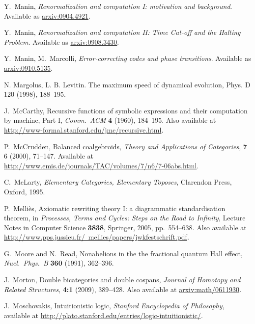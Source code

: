 \documentclass[12pt,twoside,openright]{report}
\begin{document}
\begin{thebibliography}{99}
 Y.\ Manin, \textsl{Renormalization and computation I: motivation and background}.  Available as
\href{http://arxiv.org/abs/0904.4921}{arxiv:0904.4921}.

 Y.\ Manin, \textsl{Renormalization and computation II: Time Cut-off and the Halting Problem}. Available as
\href{http://arxiv.org/abs/0908.3430}{arxiv:0908.3430}.

 Y.\ Manin, M.\ Marcolli, \textsl{Error-correcting codes and phase transitions}. Available as
\href{http://arxiv.org/abs/0910.5135}{arxiv:0910.5135}.

 N. Margolus, L. B. Levitin. The maximum speed of dynamical evolution, Phys. D 120 (1998), 188--195.

 J.\ McCarthy, Recursive functions of symbolic expressions and their computation by machine, Part I, 
{\sl Comm.\ ACM} {\bf 4} (1960), 184--195.  Also available at 
\href{http://www-formal.stanford.edu/jmc/recursive.html}
{http://www-formal.stanford.edu/jmc/recursive.html}.

 P.\ McCrudden, Balanced coalgebroids, \textsl{Theory and Applications of Categories}, \textbf{7} 6 (2000), 71--147.  Available at \href{http://www.emis.de/journals/TAC/volumes/7/n6/7-06abs.html}{http://www.emis.de/journals/TAC/volumes/7/n6/7-06abs.html}.

 C.\ McLarty, {\sl Elementary Categories, Elementary Toposes}, Clarendon Press, Oxford, 1995.

 P.\ Melli\`es, Axiomatic rewriting theory I: a diagrammatic standardisation theorem, in {\sl Processes, Terms and Cycles: Steps on the Road to Infinity}, Lecture Notes in Computer Science {\bf 3838}, Springer, 2005, pp.\ 554--638.  Also available at 
\href{http://www.pps.jussieu.fr/~mellies/papers/jwkfestschrift.pdf}
{http://www.pps.jussieu.fr/~mellies/papers/jwkfestschrift.pdf}.

 G.\ Moore and N.\ Read, Nonabelions in the the fractional quantum Hall effect, {\sl Nucl.\ Phys.\ B} 
{\bf 360} (1991), 362--396.

 J.\ Morton, Double bicategories and double cospans, \textsl{Journal of Homotopy and Related Structures}, \textbf{4:1} (2009), 389--428.  Also available at \href{http://arxiv.org/abs/math/0611930}{arxiv:math/0611930}.

 J.\ Moschovakis, Intuitionistic logic,
{\sl Stanford Encyclopedia of Philosophy}, available at \hfill \break
\href{http://plato.stanford.edu/entries/logic-intuitionistic/}
{http://plato.stanford.edu/entries/logic-intuitionistic/}.


\end{thebibliography}
\end{document}

